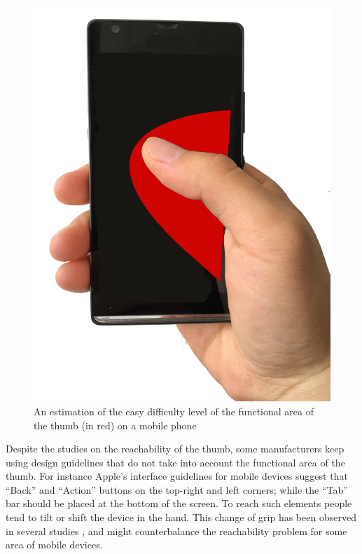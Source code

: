 \documentclass{sigchi}
\begin{document}
\begin{figure}[h]
\centering
  \includegraphics[scale=0.15]{figures/functAreaThumb}
  \caption{An estimation of the easy difficulty level of the functional area of the thumb (in red) on a mobile phone}
  \label{fig:figure1}
\end{figure}

Despite the studies on the reachability of the thumb, some manufacturers keep using design guidelines that do not take into account the functional area of the thumb. 
For instance Apple’s interface guidelines for mobile devices suggest that “Back” and “Action” buttons on the top-right and left corners; while the “Tab” bar should be placed at the bottom of the screen. To reach such elements people tend to tilt or shift the device in the hand. This change of grip has been observed in several studies \cite{Karlson06understandingsingle-handed,Goel:2012:GUB:2380116.2380184,Negulescu:2015:GCI:2702123.2702185}, and might counterbalance the reachability problem for some area of mobile devices. 
\end{document}

